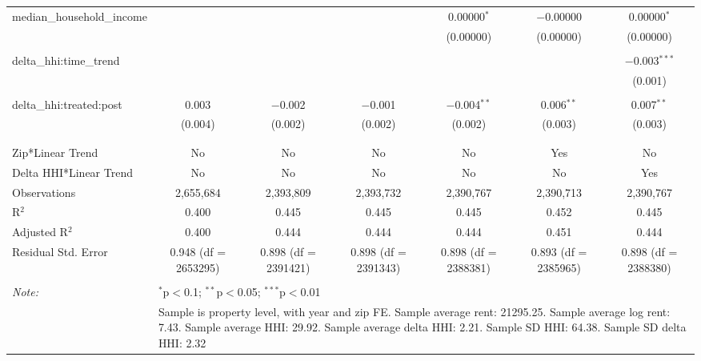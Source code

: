 \begin{table}[H]
{\begin{tabular}{@{\extracolsep{5pt}}lcccccc}
  median\_household\_income &  &  &  & 0.00000$^{*}$ & $-$0.00000 & 0.00000$^{*}$ \\  

   &  &  &  & (0.00000) & (0.00000) & (0.00000) \\  

   & & & & & & \\  

  delta\_hhi:time\_trend &  &  &  &  &  & $-$0.003$^{***}$ \\  

   &  &  &  &  &  & (0.001) \\  

   & & & & & & \\  

  delta\_hhi:treated:post & 0.003 & $-$0.002 & $-$0.001 & $-$0.004$^{**}$ & 0.006$^{**}$ & 0.007$^{**}$ \\  

   & (0.004) & (0.002) & (0.002) & (0.002) & (0.003) & (0.003) \\  

   & & & & & & \\  

 \hline \\[-1.8ex]  

 Zip*Linear Trend & No & No & No & No & Yes & No \\  

 Delta HHI*Linear Trend & No & No & No & No & No & Yes \\  

 Observations & 2,655,684 & 2,393,809 & 2,393,732 & 2,390,767 & 2,390,713 & 2,390,767 \\  

 R$^{2}$ & 0.400 & 0.445 & 0.445 & 0.445 & 0.452 & 0.445 \\  

 Adjusted R$^{2}$ & 0.400 & 0.444 & 0.444 & 0.444 & 0.451 & 0.444 \\  

 Residual Std. Error & 0.948 (df = 2653295) & 0.898 (df = 2391421) & 0.898 (df = 2391343) & 0.898 (df = 2388381) & 0.893 (df = 2385965) & 0.898 (df = 2388380) \\  

 \hline  

 \hline \\[-1.8ex]  

 \textit{Note:}  & \multicolumn{6}{l}{$^{*}$p$<$0.1; $^{**}$p$<$0.05; $^{***}$p$<$0.01} \\  

  & \multicolumn{6}{l}{Sample is property level, with year and zip FE. Sample average rent: 21295.25. Sample average log rent: 7.43. Sample average HHI: 29.92. Sample average delta HHI: 2.21. Sample SD HHI: 64.38. Sample SD delta HHI: 2.32} \\  

 \end{tabular}}  

 \end{table}  

